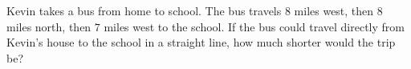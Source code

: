 Kevin takes a bus from home to school. The bus travels $8$ miles west, then $8$ miles north, then $7$ miles west to the school. If the bus could travel directly from Kevin's house to the school in a straight line, how much shorter would the trip be?
